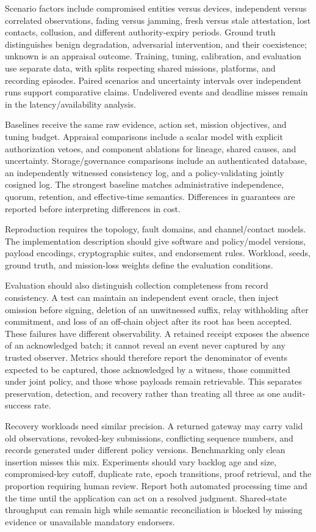 Scenario factors include compromised entities versus devices, independent versus correlated observations, fading versus jamming, fresh versus stale attestation, lost contacts, collusion, and different authority-expiry periods. Ground truth distinguishes benign degradation, adversarial intervention, and their coexistence; unknown is an appraisal outcome. Training, tuning, calibration, and evaluation use separate data, with splits respecting shared missions, platforms, and recording episodes. Paired scenarios and uncertainty intervals over independent runs support comparative claims. Undelivered events and deadline misses remain in the latency/availability analysis.

Baselines receive the same raw evidence, action set, mission objectives, and tuning budget. Appraisal comparisons include a scalar model with explicit authorization vetoes, and component ablations for lineage, shared causes, and uncertainty. Storage/governance comparisons include an authenticated database, an independently witnessed consistency log, and a policy-validating jointly cosigned log. The strongest baseline matches administrative independence, quorum, retention, and effective-time semantics. Differences in guarantees are reported before interpreting differences in cost.

Reproduction requires the topology, fault domains, and channel/contact models. The implementation description should give software and policy/model versions, payload encodings, cryptographic suites, and endorsement rules. Workload, seeds, ground truth, and mission-loss weights define the evaluation conditions.

Evaluation should also distinguish collection completeness from record consistency. A test can maintain an independent event oracle, then inject omission before signing, deletion of an unwitnessed suffix, relay withholding after commitment, and loss of an off-chain object after its root has been accepted. These failures have different observability. A retained receipt exposes the absence of an acknowledged batch; it cannot reveal an event never captured by any trusted observer. Metrics should therefore report the denominator of events expected to be captured, those acknowledged by a witness, those committed under joint policy, and those whose payloads remain retrievable. This separates preservation, detection, and recovery rather than treating all three as one audit-success rate.

Recovery workloads need similar precision. A returned gateway may carry valid old observations, revoked-key submissions, conflicting sequence numbers, and records generated under different policy versions. Benchmarking only clean insertion misses this mix. Experiments should vary backlog age and size, compromised-key cutoff, duplicate rate, epoch transitions, proof retrieval, and the proportion requiring human review. Report both automated processing time and the time until the application can act on a resolved judgment. Shared-state throughput can remain high while semantic reconciliation is blocked by missing evidence or unavailable mandatory endorsers.

